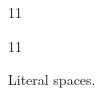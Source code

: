\documentclass[paper=A4]{ropas-poster}
\begin{document}
\begin{postergrid}{1}{1}
\begin{posterblock}{1}{1}
\begin{verbatim*}
Literal spaces.
\end{verbatim*}
\end{posterblock}
\end{postergrid}
\end{document}
